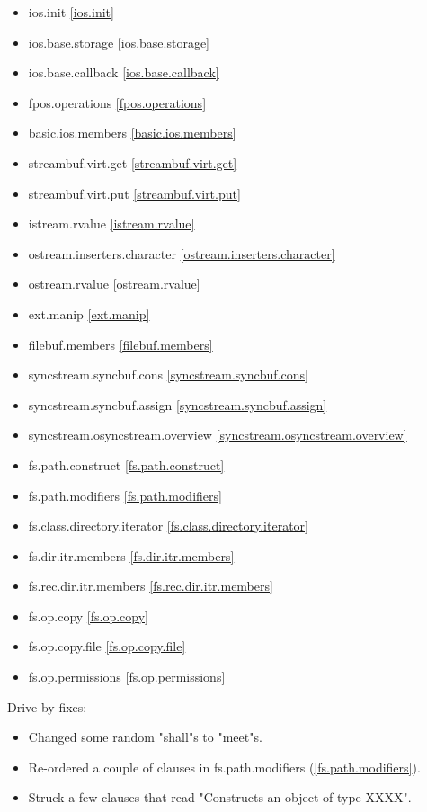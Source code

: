 \begin{multicols}{2}
\begin{itemize}
\item{ios.init}							\ref{ios.init}
\item{ios.base.storage}					\ref{ios.base.storage}
\item{ios.base.callback}				\ref{ios.base.callback}
\item{fpos.operations}					\ref{fpos.operations}
\item{basic.ios.members}				\ref{basic.ios.members}
\item{streambuf.virt.get}				\ref{streambuf.virt.get}
\item{streambuf.virt.put}				\ref{streambuf.virt.put}
\item{istream.rvalue}					\ref{istream.rvalue}
\item{ostream.inserters.character}		\ref{ostream.inserters.character}
\item{ostream.rvalue}					\ref{ostream.rvalue}
\item{ext.manip}						\ref{ext.manip}
\item{filebuf.members}					\ref{filebuf.members}
\item{syncstream.syncbuf.cons}			\ref{syncstream.syncbuf.cons}
\item{syncstream.syncbuf.assign}		\ref{syncstream.syncbuf.assign}
\item{syncstream.osyncstream.overview}	\ref{syncstream.osyncstream.overview}
\item{fs.path.construct}				\ref{fs.path.construct}
\item{fs.path.modifiers}				\ref{fs.path.modifiers}
\item{fs.class.directory.iterator}		\ref{fs.class.directory.iterator}
\item{fs.dir.itr.members}				\ref{fs.dir.itr.members}
\item{fs.rec.dir.itr.members}			\ref{fs.rec.dir.itr.members}
\item{fs.op.copy}						\ref{fs.op.copy}
\item{fs.op.copy.file}					\ref{fs.op.copy.file}
\item{fs.op.permissions}				\ref{fs.op.permissions}
\end{itemize}
\end{multicols}

Drive-by fixes:
\begin{itemize}
\item{Changed some random "shall"s to "meet"s.}
\item{Re-ordered a couple of clauses in fs.path.modifiers (\ref{fs.path.modifiers}). }
\item{Struck a few clauses that read "Constructs an object of type XXXX".}
\end{itemize}

